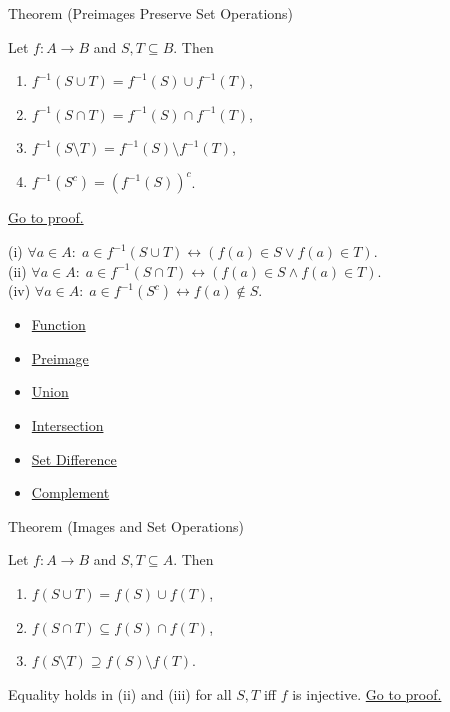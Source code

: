 \begin{theorembox}{Theorem (Preimages Preserve Set Operations)}
\begin{theorem}\label{thm:preimage-ops}
Let $f : A \to B$ and $S, T \subseteq B$. Then
\begin{enumerate}[label=(\roman*)]
\item $f^{-1}(S \cup T) = f^{-1}(S) \cup f^{-1}(T)$,
\item $f^{-1}(S \cap T) = f^{-1}(S) \cap f^{-1}(T)$,
\item $f^{-1}(S \setminus T) = f^{-1}(S) \setminus f^{-1}(T)$,
\item $f^{-1}(S^c) = (f^{-1}(S))^c$.
\end{enumerate}
\hyperref[prf:preimage-ops]{Go to proof.}
\end{theorem}
\end{theorembox}

\begin{remark*}
(i) $\forall a \in A:\; a \in f^{-1}(S\cup T) \leftrightarrow (f(a)\in S \vee f(a)\in T)$.\\
(ii) $\forall a \in A:\; a \in f^{-1}(S\cap T) \leftrightarrow (f(a)\in S \wedge f(a)\in T)$.\\
(iv) $\forall a \in A:\; a \in f^{-1}(S^c) \leftrightarrow f(a)\notin S$.
\end{remark*}

\begin{dependencies}
\begin{itemize}
  \item \hyperref[def:function]{Function}
  \item \hyperref[def:preimage]{Preimage}
  \item \hyperref[def:union]{Union}
  \item \hyperref[def:intersection]{Intersection}
  \item \hyperref[def:set-difference]{Set Difference}
  \item \hyperref[def:complement]{Complement}
\end{itemize}
\end{dependencies}

\begin{theorembox}{Theorem (Images and Set Operations)}
\begin{theorem}\label{thm:image-ops}
Let $f : A \to B$ and $S, T \subseteq A$. Then
\begin{enumerate}[label=(\roman*)]
\item $f(S \cup T) = f(S) \cup f(T)$,
\item $f(S \cap T) \subseteq f(S) \cap f(T)$,
\item $f(S \setminus T) \supseteq f(S) \setminus f(T)$.
\end{enumerate}
Equality holds in (ii) and (iii) for all $S,T$ iff $f$ is injective.
\hyperref[prf:image-ops]{Go to proof.}
\end{theorem}
\end{theorembox}


